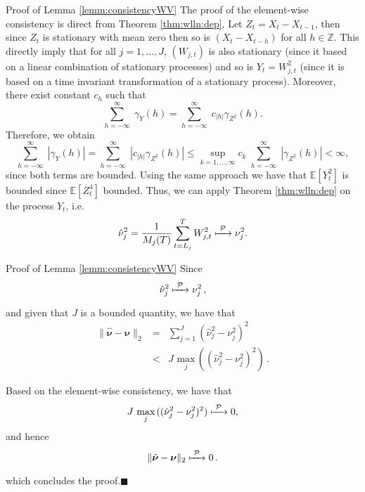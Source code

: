 \documentclass[envcountsect,usenames,dvipsnames]{beamer}
\theoremstyle{mystyle}
\begin{document}
\begin{frame}{Proof of Lemma \ref{lemm:consistencyWV}}
\footnotesize
The proof of the element-wise consistency is direct from Theorem \ref{thm:wlln:dep}. Let $Z_t = X_t - X_{t-1}$, then since $Z_t$ is stationary with mean zero then so is $(X_t - X_{t-h})$ for all $h \in \mathbb{Z}$. This directly imply that for all $j = 1, \dots, J$, $(W_{j,t})$ is also stationary (since it based on a linear combination of stationary processes) and so is $Y_t = W_{j,t}^2$ (since it is based on a time invariant transformation of a stationary process). Moreover, there exist constant $c_h$ such that
%
\begin{equation*}
    \sum_{h = -\infty}^{\infty} \; \gamma_Y (h) = \sum_{h = -\infty}^{\infty} \; c_{|h|} \gamma_{Z^2} (h).
\end{equation*}
%
Therefore, we obtain
%
\begin{equation*}
    \sum_{h = -\infty}^{\infty} \; |\gamma_Y (h)| = \sum_{h = -\infty}^{\infty} \; |c_{|h|} \gamma_{Z^2} (h)| \leq \sup_{k = 1, ..., \infty} c_k \; \sum_{h = -\infty}^{\infty} \; |\gamma_{Z^2} (h)| < \infty,
\end{equation*}
%
since both terms are bounded. Using the same approach we have that $\mathbb{E}\left[Y_t^2\right]$ is bounded since $\mathbb{E}\left[Z_t^4\right]$ bounded. Thus, we can apply Theorem \ref{thm:wlln:dep} on the process $Y_t$, i.e.
%
\begin{equation*}
    \hat{\nu}^2_j = \frac{1}{M_j(T)} \sum_{t=L_j}^{T} {W}_{j,t}^2 \xmapsto[\;\;\;\;\; ]{\mathcal{P}}  \nu^2_j.
\end{equation*}
%
\end{frame}

\begin{frame}{Proof of Lemma \ref{lemm:consistencyWV}}
\footnotesize
Since
$$\hat{\nu}^2_j \xmapsto[\;\;\;\;\; ]{\mathcal{P}}  \nu^2_j \, ,$$
and given that $J$ is a bounded quantity, we have that
%
\begin{eqnarray*}
    \|\hat{\bm{\nu}} - \bm{\nu}\|_2 &=& \sum_{j=1}^J (\hat{\nu}^2_j - \nu^2_j)^2\\
    &<& J \,\, \underset{j}{\text{max}}\, ((\hat{\nu}^2_j - \nu^2_j)^2) \, .
\end{eqnarray*}

Based on the element-wise consistency, we have that
%
\begin{equation*}
    J \,\, \underset{j}{\text{max}}\, ((\hat{\nu}^2_j - \nu^2_j)^2)  \xmapsto[\;\;\;\;\; ]{\mathcal{P}} 0,
\end{equation*}
%
and hence
%
\begin{equation*}
    \|\hat{\bm{\nu}} - \bm{\nu}\|_2 \xmapsto[\;\;\;\;\; ]{\mathcal{P}} 0 \, .
\end{equation*}
%
which concludes the proof.\hfill $\blacksquare$

\hyperlink{lemma:consistencyWV}{}

\end{frame}
\end{document}
